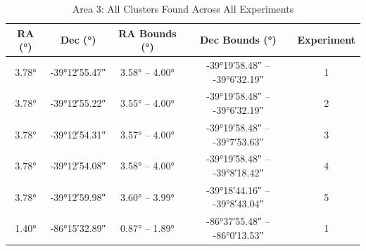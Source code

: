 \begin{longtable}{c c c c c}
    \caption{\label{tb:results-raw-a3}Area 3: All Clusters Found Across All Experiments}                                                                                                                                                                                              \\
    \toprule
    RA (°)                                & Dec (°)                                      & RA Bounds (°)                                                                  & Dec Bounds (°)                                                                               & Experiment \\
    \midrule
    \ang[minimum-integer-digits=2]{3.78}  & \ang[minimum-integer-digits=2]{-39;12;55.47} & \ang[minimum-integer-digits=2]{3.58} -- \ang[minimum-integer-digits=2]{4.00}   & \ang[minimum-integer-digits=2]{-39;19;58.48} -- \ang[minimum-integer-digits=2]{-39;6;32.19}  & 1          \\ %
    \ang[minimum-integer-digits=2]{3.78}  & \ang[minimum-integer-digits=2]{-39;12;55.22} & \ang[minimum-integer-digits=2]{3.55} -- \ang[minimum-integer-digits=2]{4.00}   & \ang[minimum-integer-digits=2]{-39;19;58.48} -- \ang[minimum-integer-digits=2]{-39;6;32.19}  & 2          \\ %
    \ang[minimum-integer-digits=2]{3.78}  & \ang[minimum-integer-digits=2]{-39;12;54.31} & \ang[minimum-integer-digits=2]{3.57} -- \ang[minimum-integer-digits=2]{4.00}   & \ang[minimum-integer-digits=2]{-39;19;58.48} -- \ang[minimum-integer-digits=2]{-39;7;53.63}  & 3          \\ %
    \ang[minimum-integer-digits=2]{3.78}  & \ang[minimum-integer-digits=2]{-39;12;54.08} & \ang[minimum-integer-digits=2]{3.58} -- \ang[minimum-integer-digits=2]{4.00}   & \ang[minimum-integer-digits=2]{-39;19;58.48} -- \ang[minimum-integer-digits=2]{-39;8;18.42}  & 4          \\ %
    \ang[minimum-integer-digits=2]{3.78}  & \ang[minimum-integer-digits=2]{-39;12;59.98} & \ang[minimum-integer-digits=2]{3.60} -- \ang[minimum-integer-digits=2]{3.99}   & \ang[minimum-integer-digits=2]{-39;18;44.16} -- \ang[minimum-integer-digits=2]{-39;8;43.04}  & 5          \\ %
    \ang[minimum-integer-digits=2]{1.40}  & \ang[minimum-integer-digits=2]{-86;15;32.89} & \ang[minimum-integer-digits=2]{0.87} -- \ang[minimum-integer-digits=2]{1.89}   & \ang[minimum-integer-digits=2]{-86;37;55.48} -- \ang[minimum-integer-digits=2]{-86;0;13.53}  & 1          \\ %

\end{longtable}
